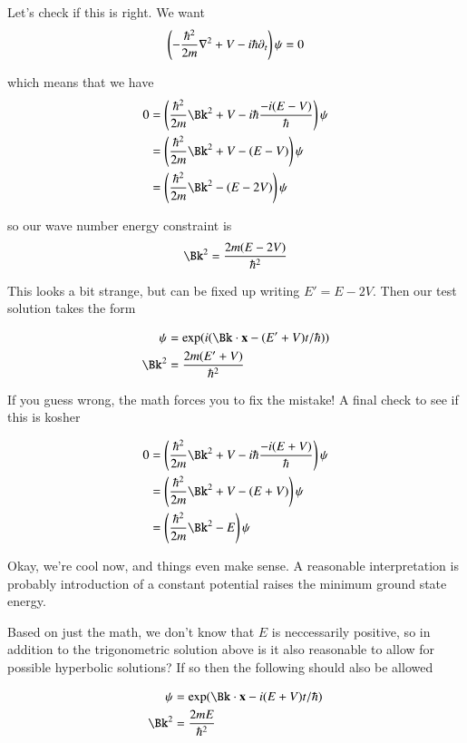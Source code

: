 \documentclass{article}
\begin{document}
Let's check if this is right.  We want 
\begin{align*}
\left(-\frac{\hbar^2}{2m}\nabla^2 + V -i\hbar \partial_t\right)\psi = 0
\end{align*}

which means that we have
\begin{align*}
0 &=
\left(\frac{\hbar^2}{2m}\Bk^2 + V -i\hbar \frac{-i(E - V)}{\hbar}\right)\psi \\
&= \left(\frac{\hbar^2}{2m}\Bk^2 + V -(E - V)\right)\psi \\
&= \left(\frac{\hbar^2}{2m}\Bk^2 - (E - 2V)\right)\psi \\
\end{align*}

so our wave number energy constraint is
\begin{align*}
\Bk^2 = \frac{2 m (E - 2V)}{\hbar^2}
\end{align*}

This looks a bit strange, but can be fixed up writing $E' = E - 2V$.  Then our test solution takes the form

\begin{align*}
\psi &= \exp(i(\Bk \cdot \Bx - (E' + V) t/\hbar)) \\
\Bk^2 &= \frac{2 m (E' + V)}{\hbar^2}
\end{align*}

If you guess wrong, the math forces you to fix the mistake!  A final check to see if this is kosher 

\begin{align*}
0 &=
\left(\frac{\hbar^2}{2m}\Bk^2 + V -i\hbar \frac{-i(E + V)}{\hbar}\right)\psi \\
&= \left(\frac{\hbar^2}{2m}\Bk^2 + V -(E + V)\right)\psi \\
&= \left(\frac{\hbar^2}{2m}\Bk^2 - E\right)\psi \\
\end{align*}

Okay, we're cool now, and things even make sense.  A reasonable interpretation is probably introduction of a constant potential raises the minimum ground state energy.

Based on just the math, we don't know that $E$ is neccessarily positive, so in addition to the trigonometric solution above is it also reasonable to
allow for possible
hyperbolic solutions?  If so then the following should also be allowed

\begin{align*}
\psi &= \exp(\Bk \cdot \Bx - i(E + V) t/\hbar) \\
\Bk^2 &= \frac{2 m E}{\hbar^2}
\end{align*}
\end{document}
